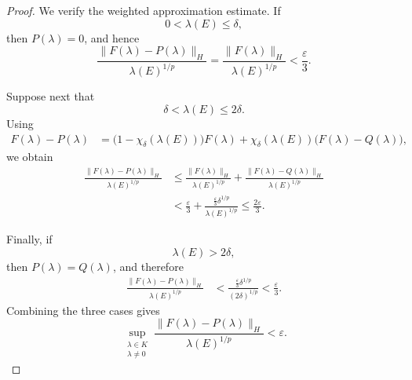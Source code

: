 \documentclass[10pt,a4paper]{amsart}
\begin{document}
\begin{proof}
We verify the weighted approximation estimate. If
\[
        0<\lambda(E)\le\delta,
\]
then \(P(\lambda)=0\), and hence
\[
\frac{\lVert F(\lambda)-P(\lambda)\rVert_H}
     {\lambda(E)^{1/p}}
=
\frac{\lVert F(\lambda)\rVert_H}
     {\lambda(E)^{1/p}}
<
\frac{\varepsilon}{3}.
\]

Suppose next that
\[
        \delta<\lambda(E)\le2\delta.
\]
Using
\[
\begin{aligned}
F(\lambda)-P(\lambda)
&=
\bigl(1-\chi_\delta(\lambda(E))\bigr)F(\lambda)
+
\chi_\delta(\lambda(E))
\bigl(F(\lambda)-Q(\lambda)\bigr),
\end{aligned}
\]
we obtain
\[
\begin{aligned}
\frac{\lVert F(\lambda)-P(\lambda)\rVert_H}
     {\lambda(E)^{1/p}}
&\le
\frac{\lVert F(\lambda)\rVert_H}
     {\lambda(E)^{1/p}}
+
\frac{\lVert F(\lambda)-Q(\lambda)\rVert_H}
     {\lambda(E)^{1/p}}
\\
&<
\frac{\varepsilon}{3}
+
\frac{
        \frac{\varepsilon}{3}\delta^{1/p}
     }{
        \lambda(E)^{1/p}
     }
\le
\frac{2\varepsilon}{3}.
\end{aligned}
\]

Finally, if
\[
        \lambda(E)>2\delta,
\]
then \(P(\lambda)=Q(\lambda)\), and therefore
\[
\begin{aligned}
\frac{\lVert F(\lambda)-P(\lambda)\rVert_H}
     {\lambda(E)^{1/p}}
&<
\frac{
        \frac{\varepsilon}{3}\delta^{1/p}
     }{
        (2\delta)^{1/p}
     }
<
\frac{\varepsilon}{3}.
\end{aligned}
\]
Combining the three cases gives
\[
\sup_{\substack{\lambda\in K\\ \lambda\ne0}}
\frac{\lVert F(\lambda)-P(\lambda)\rVert_H}
     {\lambda(E)^{1/p}}
<
\varepsilon.
\]


\end{proof}
\end{document}
